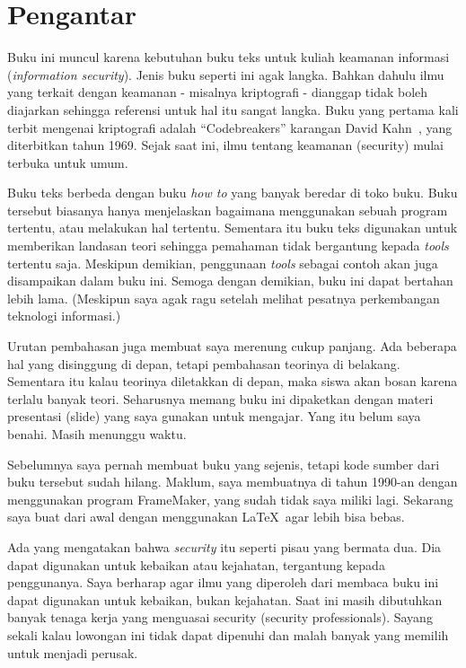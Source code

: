 \chapter{Pengantar}

Buku ini muncul karena kebutuhan buku teks untuk kuliah
keamanan informasi ({\em information security}).
Jenis buku seperti ini agak langka.
Bahkan dahulu ilmu yang terkait dengan keamanan - misalnya kriptografi -
dianggap tidak boleh diajarkan sehingga referensi untuk hal itu
sangat langka.
Buku yang pertama kali terbit mengenai kriptografi adalah
``Codebreakers'' karangan David Kahn~\cite{davidkahn},
yang diterbitkan tahun 1969.
Sejak saat ini, ilmu tentang keamanan (security) mulai terbuka untuk umum.

Buku teks berbeda dengan buku {\em how to} yang banyak beredar
di toko buku. Buku tersebut biasanya hanya menjelaskan bagaimana
menggunakan sebuah program tertentu, atau melakukan hal tertentu.
Sementara itu buku teks digunakan untuk memberikan landasan teori
sehingga pemahaman tidak bergantung kepada {\em tools} tertentu saja.
Meskipun demikian, penggunaan {\em tools} sebagai contoh akan
juga disampaikan dalam buku ini.
Semoga dengan demikian, buku ini dapat bertahan lebih lama.
(Meskipun saya agak ragu setelah melihat pesatnya perkembangan
teknologi informasi.)

Urutan pembahasan juga membuat saya merenung cukup panjang.
Ada beberapa hal yang disinggung di depan, tetapi pembahasan teorinya
di belakang. Sementara itu kalau teorinya diletakkan di depan,
maka siswa akan bosan karena terlalu banyak teori.
Seharusnya memang buku ini dipaketkan dengan materi presentasi
(slide) yang saya gunakan untuk mengajar. 
Yang itu belum saya benahi. Masih menunggu waktu.

Sebelumnya saya pernah membuat buku yang sejenis, tetapi kode sumber
dari buku tersebut sudah hilang.
Maklum, saya membuatnya di tahun 1990-an dengan menggunakan program
FrameMaker, yang sudah tidak saya miliki lagi.
Sekarang saya buat dari awal dengan menggunakan \LaTeX \ agar
lebih bisa bebas.

Ada yang mengatakan bahwa {\em security} itu seperti pisau yang bermata dua.
Dia dapat digunakan untuk kebaikan atau kejahatan, tergantung kepada
penggunanya. Saya berharap agar ilmu yang diperoleh dari membaca buku ini dapat
digunakan untuk kebaikan, bukan kejahatan. Saat ini masih dibutuhkan banyak
tenaga kerja yang menguasai security (security professionals). Sayang sekali
kalau lowongan ini tidak dapat dipenuhi dan malah banyak yang memilih untuk
menjadi perusak.

